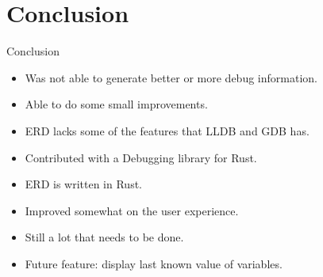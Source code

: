 \section{Conclusion}

\begin{frame}{Conclusion}
    \begin{itemize}
	\item Was not able to generate better or more debug information.
        \item Able to do some small improvements.
        \item ERD lacks some of the features that LLDB and GDB has.
        \item Contributed with a Debugging library for Rust.
        \item ERD is written in Rust.
        \item Improved somewhat on the user experience.
        \item Still a lot that needs to be done.
        \item Future feature: display last known value of variables.
    \end{itemize}
\end{frame}




